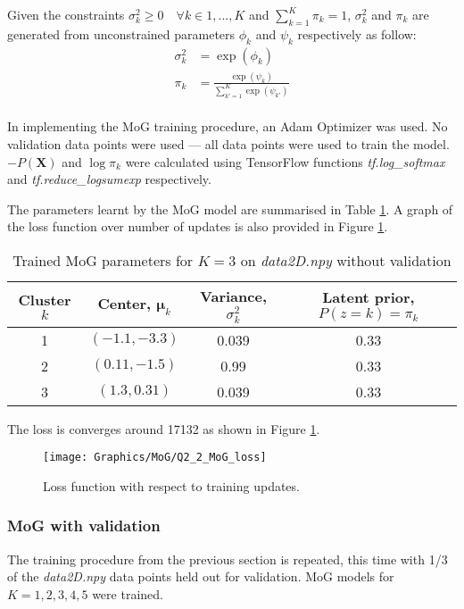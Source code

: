 \documentclass[a4paper,12pt]{article}
\newcommand{\X}{\mathbf{X}}
\begin{document}
Given the constraints $\sigma_k^2 \geq 0 \quad \forall k \in 1, ..., K$ and $\sum_{k=1}^K \pi_k = 1$, $\sigma_k^2$ and $\pi_k$ are generated from unconstrained parameters $\phi_k$ and $\psi_k$ respectively as follow:
\begin{align}
\sigma_k^2 & = \exp(\phi_k) \\
\pi_k & = \frac{\exp(\psi_k)}{\sum_{k'=1}^K \exp(\psi_{k'})}
\end{align}
\\
In implementing the MoG training procedure, an Adam Optimizer was used. No validation data points were used --- all data points were used to train the model. $-P(\X)$ and $\log \pi_k$ were calculated using TensorFlow functions \textit{tf.log\_softmax} and \textit{tf.reduce\_logsumexp} respectively.

The parameters learnt by the MoG model are summarised in Table \ref{tab:MoG/Q2_2_results}. A graph of the loss function over number of updates is also provided in Figure \ref{fig:MoG/Q2_2_MoG_loss}.

\clearpage

\begin{table}[!htb]
\centering
\caption{Trained MoG parameters for $K=3$ on \textit{data2D.npy} without validation}
\label{tab:MoG/Q2_2_results}
\vspace{1em}
\begin{tabular}{|c|c|c|c|} \hline
Cluster $k$ & Center, $\bm{\mu}_k$ & Variance, $\sigma_k^2$ & Latent prior, $P(z = k) = \pi_k$ \\ \hline
1 & $(-1.1, -3.3)$ & 0.039 & 0.33 \\
2 & $(0.11, -1.5)$ & 0.99 & 0.33 \\
3 & $(1.3, 0.31)$ & 0.039 & 0.33 \\ \hline
\end{tabular}
\end{table}

The loss is converges around 17132 as shown in Figure \ref{fig:MoG/Q2_2_MoG_loss}. 

\begin{figure}[!htb]
\centering
\texttt{[image: Graphics/MoG/Q2\_2\_MoG\_loss]}
\caption{Loss function with respect to training updates.}
\label{fig:MoG/Q2_2_MoG_loss}
\end{figure}

\clearpage
\subsubsection{MoG with validation}
\label{sec:MoG/Q2.3_validation}
The training procedure from the previous section is repeated, this time with 1/3 of the \textit{data2D.npy} data points held out for validation. MoG models for $K = 1, 2, 3, 4, 5$ were trained.
\end{document}
